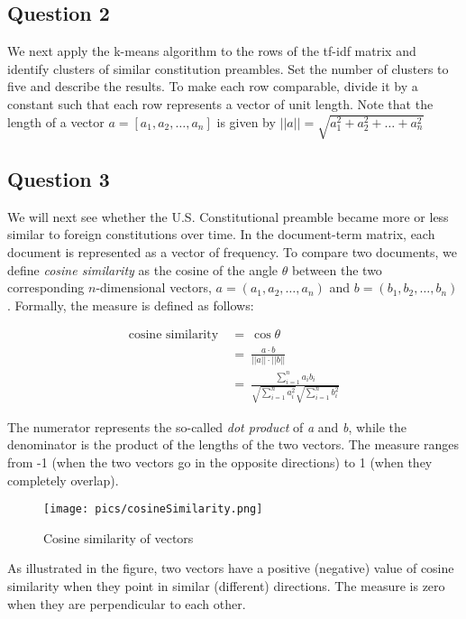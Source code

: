 \documentclass[]{article}
\begin{document}
\subsection{Question 2}\label{question-2}

We next apply the k-means algorithm to the rows of the tf-idf matrix and
identify clusters of similar constitution preambles. Set the number of
clusters to five and describe the results. To make each row comparable,
divide it by a constant such that each row represents a vector of unit
length. Note that the length of a vector $a=[a_1,a_2,\dots,a_n]$ is
given by $||a||=\sqrt{a_1^2+a_2^2+\dots+a_n^2}$

\subsection{Question 3}\label{question-3}

We will next see whether the U.S. Constitutional preamble became more or
less similar to foreign constitutions over time. In the document-term
matrix, each document is represented as a vector of frequency. To
compare two documents, we define \emph{cosine similarity} as the cosine
of the angle $\theta$ between the two corresponding $n$-dimensional
vectors, $a=(a_1,a_2,\dots,a_n)$ and $b=(b_1,b_2,\dots,b_n)$. Formally,
the measure is defined as follows:

\begin{align}
\text{cosine similarity} &\ = \ \cos \theta \\
      &\ = \ \frac{a \cdot b}{||a||\cdot ||b||} \\
      &\ = \ \frac{\sum_{i=1}^n a_i b_i}
                 {\sqrt{\sum_{i=1}^n a_i^2} \sqrt{\sum_{i=1}^n b_i^2}}
\end{align}

The numerator represents the so-called \emph{dot product} of \emph{a}
and \emph{b}, while the denominator is the product of the lengths of the
two vectors. The measure ranges from -1 (when the two vectors go in the
opposite directions) to 1 (when they completely overlap).

\begin{figure}[htbp]
\centering
\texttt{[image: pics/cosineSimilarity.png]}
\caption{Cosine similarity of vectors}
\end{figure}

As illustrated in the figure, two vectors have a positive (negative)
value of cosine similarity when they point in similar (different)
directions. The measure is zero when they are perpendicular to each
other.
\end{document}
